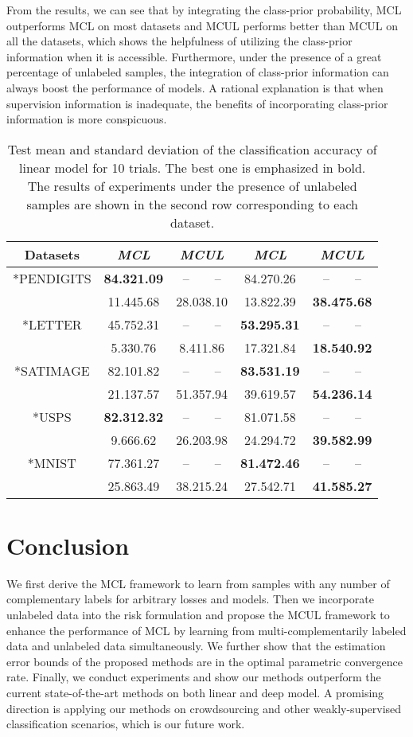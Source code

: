 \documentclass[]{article} \usepackage{geometry}
\begin{document}
From the results, we can see that by integrating the class-prior probability, MCL outperforms MCL on most datasets and MCUL performs better than MCUL on all the datasets, which shows the helpfulness of utilizing the class-prior information when it is accessible. Furthermore, under the presence of a great percentage of unlabeled samples, the integration of class-prior information can always boost the performance of models. A rational explanation is that when supervision information is inadequate, the benefits of incorporating class-prior information is more conspicuous.

\begin{table}[tbph]
\caption{\footnotesize Test mean and standard deviation of the classification accuracy of linear model for 10 trials. The best one is emphasized in bold. The results of experiments under the presence of unlabeled samples are shown in the second row corresponding to each dataset.}
\footnotesize
\centering
\begin{tabular}{ccccc}\hline
\label{TB2}
Datasets&\textit{MCL}&\textit{MCUL}&\textit{MCL}&\textit{MCUL}\\\hline\rule{0pt}{10pt}
\multirow{2}*{PENDIGITS}&\textbf{84.321.09}&--~~~~--&84.270.26&--~~~~--\\&11.445.68&28.038.10&13.822.39&\textbf{38.475.68}\\\rule{0pt}{15pt}
\multirow{2}*{LETTER}&45.752.31&--~~~~--&\textbf{53.295.31}&--~~~~--\\&5.330.76&8.411.86&17.321.84&\textbf{18.540.92}\\\rule{0pt}{15pt}
\multirow{2}*{SATIMAGE}&82.101.82&--~~~~--&\textbf{83.531.19}&--~~~~--\\&21.137.57&51.357.94&39.619.57&\textbf{54.236.14}\\\rule{0pt}{15pt}
\multirow{2}*{USPS}&\textbf{82.312.32}&--~~~~--&81.071.58&--~~~~--\\&9.666.62&26.203.98&24.294.72&\textbf{39.582.99}\\\rule{0pt}{15pt}
\multirow{2}*{MNIST}&77.361.27&--~~~~--&\textbf{81.472.46}&--~~~~--\\&25.863.49&38.215.24&27.542.71&\textbf{41.585.27}\\\hline
\end{tabular}
\end{table}

\section{Conclusion}
We first derive the MCL framework to learn from samples with any number of complementary labels for arbitrary losses and models. Then we incorporate unlabeled data into the risk formulation and propose the MCUL framework to enhance the performance of MCL by learning from multi-complementarily labeled data and unlabeled data simultaneously. We further show that the estimation error bounds of the proposed methods are in the optimal parametric convergence rate. Finally, we conduct experiments and show our methods outperform the current state-of-the-art methods on both linear and deep model. A promising direction is applying our methods on crowdsourcing and other weakly-supervised classification scenarios, which is our future work.
\end{document}
